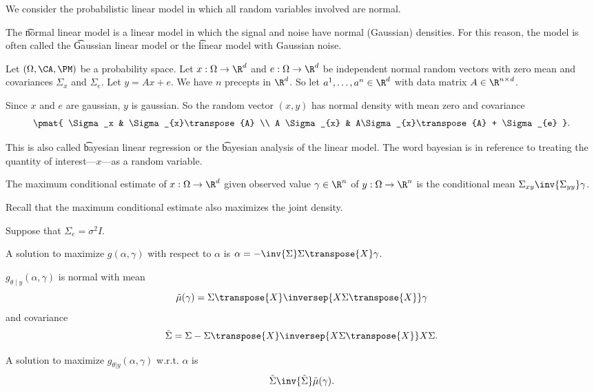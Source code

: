 

We consider the probabilistic linear model in which all random variables involved are normal.


The \t{normal linear model} is a linear model in which the signal and noise have normal (Gaussian) densities.
For this reason, the model is often called the \t{Gaussian linear model} or the \t{linear model with Gaussian noise}.

Let $(\Omega, \CA, \PM)$ be a probability space.
Let $x: \Omega \to \R^d$ and $e: \Omega \to \R^d$ be independent normal random vectors with zero mean and covariances $\Sigma_{x}$ and $\Sigma_e$.
Let $y = Ax + e$.
We have $n$ precepts in $\R^d$.
So let $a^1, \dots, a^n \in \R^d$ with data matrix $A \in \R^{n \times d}$.


Since $x$ and $e$ are gaussian, $y$ is gaussian.
So the random vector $(x, y)$ has normal density with mean zero and covariance
\[
  \pmat{
    \Sigma_x & \Sigma_{x}\transpose{A} \\
      A \Sigma_{x} & A\Sigma_{x}\transpose{A} + \Sigma_{e}
  }.
\]

This is also called \t{bayesian linear regression} or the \t{bayesian analysis of the linear model}.
The word bayesian is in reference to treating the quantity of interest---$x$---as a random variable.

\begin{proposition}
  The maximum conditional estimate of $x: \Omega \to \R^d$ given observed value $\gamma \in \R^n$ of $y: \Omega \to \R^n$ is the conditional mean $\Sigma_{xy}\inv{\Sigma_{yy}}\gamma$.
\end{proposition}
Recall that the maximum conditional estimate also maximizes the joint density.


Suppose that $\Sigma_e = \sigma^2I$.


\begin{proposition}
  A solution to maximize $g(\alpha, \gamma)$ with respect to $\alpha$ is $\alpha = -\inv{\Sigma}\Sigma\transpose{X}\gamma$.
\end{proposition}
\begin{proposition}
  $g_{\theta \mid y}(\alpha, \gamma)$ is normal with mean
  \[
    \tilde{\mu}(\gamma) = \Sigma \transpose{X}\inversep{X\Sigma\transpose{X}}\gamma
  \] and covariance \[\tilde{\Sigma} = \Sigma - \Sigma\transpose{X}\inversep{X\Sigma\transpose{X}}X\Sigma.\]%
\end{proposition}
\begin{proposition}
  A solution to maximize $g_{\theta | y}(\alpha, \gamma)$ w.r.t. $\alpha$ is
  \[
    \tilde{\Sigma}\inv{\tilde{\Sigma}}\tilde{\mu}(\gamma).
  \]
\end{proposition}


